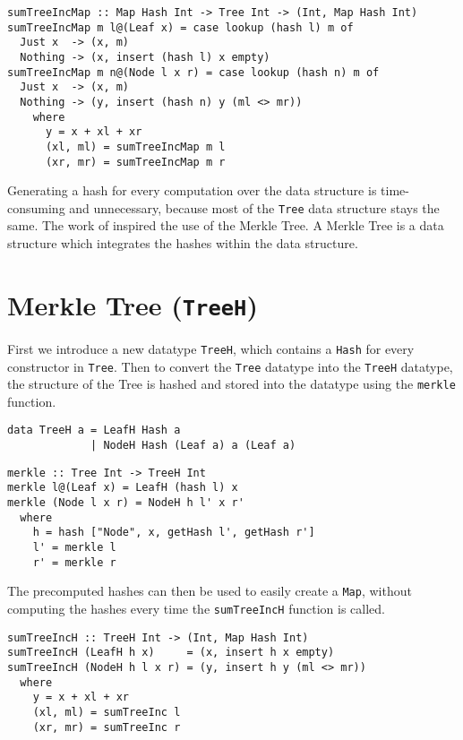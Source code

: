 \begin{verbatim}
sumTreeIncMap :: Map Hash Int -> Tree Int -> (Int, Map Hash Int)
sumTreeIncMap m l@(Leaf x) = case lookup (hash l) m of
  Just x  -> (x, m) 
  Nothing -> (x, insert (hash l) x empty)
sumTreeIncMap m n@(Node l x r) = case lookup (hash n) m of
  Just x  -> (x, m)
  Nothing -> (y, insert (hash n) y (ml <> mr))
    where
      y = x + xl + xr
      (xl, ml) = sumTreeIncMap m l
      (xr, mr) = sumTreeIncMap m r
\end{verbatim}

Generating a hash for every computation over the data structure is time-consuming and unnecessary, because most of the \texttt{Tree} data structure stays the same. The work of \citeauthor{miraldo2019efficient}\cite{miraldo2019efficient} inspired the use of the Merkle Tree. A Merkle Tree is a data structure which integrates the hashes within the data structure.

\section{Merkle Tree (\texttt{TreeH})}
First we introduce a new datatype \texttt{TreeH}, which contains a \texttt{Hash} for every constructor in \texttt{Tree}. Then to convert the \texttt{Tree} datatype into the \texttt{TreeH} datatype, the structure of the Tree is hashed and stored into the datatype using the \texttt{merkle} function.

\begin{verbatim}
data TreeH a = LeafH Hash a
             | NodeH Hash (Leaf a) a (Leaf a)
\end{verbatim}

\begin{verbatim}
merkle :: Tree Int -> TreeH Int
merkle l@(Leaf x) = LeafH (hash l) x
merkle (Node l x r) = NodeH h l' x r'
  where
    h = hash ["Node", x, getHash l', getHash r']
    l' = merkle l
    r' = merkle r
\end{verbatim}

The precomputed hashes can then be used to easily create a \texttt{Map}, without computing the hashes every time the \texttt{sumTreeIncH} function is called.

\begin{verbatim}
sumTreeIncH :: TreeH Int -> (Int, Map Hash Int)
sumTreeIncH (LeafH h x)     = (x, insert h x empty)
sumTreeIncH (NodeH h l x r) = (y, insert h y (ml <> mr))
  where
    y = x + xl + xr
    (xl, ml) = sumTreeInc l
    (xr, mr) = sumTreeInc r
\end{verbatim}

